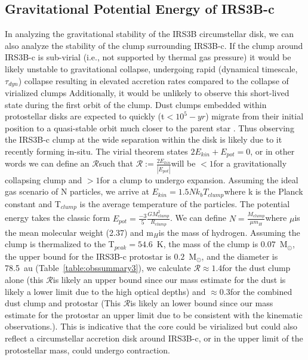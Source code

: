 \documentclass[twocolumn, 12pt]{aastex63}
\newcommand{\solm}{M$_{\odot}$}
\begin{document}


\subsection{Gravitational Potential Energy of IRS3B-c}\label{sec:gpe}
In analyzing the gravitational stability of the IRS3B circumstellar disk, we can also analyze the stability of the clump surrounding IRS3B-c. If the clump around IRS3B-c is sub-virial (i.e., not supported by thermal gas pressure) it would be likely unstable to gravitational collapse, undergoing rapid (dynamical timescale, $\tau_{dyn}$) collapse resulting in elevated accretion rates compared to the collapse of virialized clumps Additionally, it would be unlikely to observe this short-lived state during the first orbit of the clump. Dust clumps embedded within protostellar disks are expected to quickly (t$<10^{5}-yr$) migrate from their initial position to a quasi-stable orbit much closer to the parent star \citep{2019AA...631A...1V}. Thus observing the IRS3B-c clump at the wide separation within the disk is likely due to it recently forming in-situ. The virial theorem states $2E_{kin} + E_{pot}=0$, or in other words we can define an $\mathcal{R}$\space such that $\mathcal{R} := \frac{2E_{kin}}{|E_{pot}|}$\space will be $<1$\space for a gravitationally collapsing clump and $>1$\space for a clump to undergo expansion. Assuming the ideal gas scenario of N particles, we arrive at $E_{kin} = 1.5Nk_{b}T_{clump}$\space where k is the Planck constant and T$_{clump}$ is the average temperature of the particles. The potential energy takes the classic form $E_{pot} = \frac{-3}{5}\frac{GM^{2}_{clump}}{R_{clump}}$. We can define $N=\frac{M_{clump}}{\mu m_{H}}$\space where $\mu$\space is the mean molecular weight (2.37) and m$_{H}$\space is the mass of hydrogen. Assuming the clump is thermalized to the T$_{peak}=54.6$~K, the mass of the clump is $0.07$~\solm, the upper bound for the IRS3B-c protostar is $0.2$~\solm, and the diameter is 78.5~au (Table~\ref{table:obssummary3}), we calculate $\mathcal{R} \approx1.4$\space for the dust clump alone (this $\mathcal{R}$\space is likely an upper bound since our mass estimate for the dust is likely a lower limit due to the high optical depths) and $\approx0.3$\space for the combined dust clump and protostar (This $\mathcal{R}$\space is likely an lower bound since our mass estimate for the protostar an upper limit due to be consistent with the kinematic observations.). This is indicative that the core could be virialized but could also reflect a circumstellar accretion disk around IRS3B-c, or in the upper limit of the protostellar mass, could undergo contraction.
\end{document}

